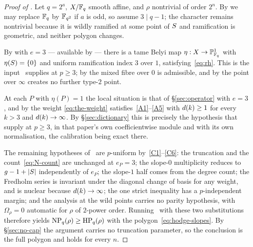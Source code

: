 \begin{proof}[Proof of ]
Let $q = 2^a$, $X/\mathbb{F}_q$ smooth affine, and $\rho$ nontrivial of order $2^n$.
By  we may replace $\mathbb{F}_q$ by $\mathbb{F}_{q^2}$ if $a$ is odd,
so assume $3 \mid q-1$; the character remains nontrivial because it is
wildly ramified at some point of $S$ and ramification is geometric, and
neither polygon changes.

By  with $e = 3$ --- available by
 --- there is a tame Belyi map $\eta : X \to
\mathbb{P}^1_{\mathbb{F}_q}$ with $\eta(S) = \{0\}$ and uniform ramification index $3$
over $1$, satisfying~\eqref{eq:rh}. This is the input~\cite[Lemma 3.1]{kramermiller2020abelian} supplies at $p \ge 3$; by
 the mixed fibre over $0$ is admissible, and by
 the point over $\infty$ creates no further type-$2$
point.

At each $P$ with $\eta(P) = 1$ the local situation is that of
\S\ref{sec:operator} with $e = 3$, and by  the weight
\eqref{eq:the-weight} satisfies~\ref{A1}--\ref{A5} with $d(k) \ge 1$ for
every $k > 3$ and $d(k) \to \infty$. By \S\ref{sec:dictionary} this is
precisely the hypothesis that~\cite[\S4.2 and Proposition 4.2]{kramermiller2020abelian} supply at $p \ge
3$, in that paper's own coefficientwise module and with its own
normalisation, the calibration being exact there.

The remaining hypotheses of~\cite{kramermiller2020abelian} are $p$-uniform
by~\ref{C1}--\ref{C6}: the truncation and the count~\eqref{eq:N-count} are
unchanged at $e_P = 3$; the slope-$0$ multiplicity reduces to $g-1+|S|$
independently of $e_P$; the slope-$1$ half comes from the degree count; the
Fredholm series is invariant under the diagonal change of basis for any
weight, and is nuclear because $d(k)\to\infty$; the one strict
inequality has a $p$-independent margin; and the analysis at the wild points
carries no parity hypothesis, with $\Omega_\rho = 0$ automatic for $\rho$ of
$2$-power order. Running~\cite{kramermiller2020abelian} with these two
substitutions therefore yields $\operatorname{NP}_q(\rho) \ge \operatorname{HP}_q(\rho)$ with the
polygon~\eqref{eq:hodge-slopes}. By \S\ref{sec:no-cap} the argument carries
no truncation parameter, so the conclusion is the full polygon and holds for
every $n$.
\end{proof}

